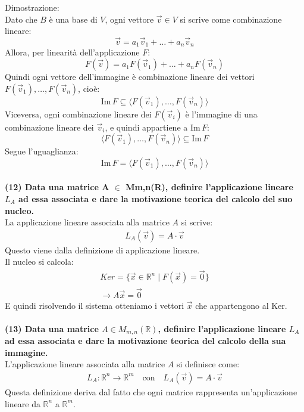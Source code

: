 \documentclass[10pt]{extarticle}
\begin{document}
Dimostrazione: \\
Dato che $B$ è una base di $V$, ogni vettore $\vec{v} \in V$ si scrive come combinazione lineare:
\[
\vec{v} = a_1 \vec{v}_1 + \dots + a_n \vec{v}_n
\]
Allora, per linearità dell'applicazione $F$:
\[
F(\vec{v}) = a_1 F(\vec{v}_1) + \dots + a_n F(\vec{v}_n)
\]
Quindi ogni vettore dell'immagine è combinazione lineare dei vettori $F(\vec{v}_1), \dots, F(\vec{v}_n)$, cioè:
\[
\text{Im}\, F \subseteq \langle F(\vec{v}_1), \dots, F(\vec{v}_n) \rangle
\]
Viceversa, ogni combinazione lineare dei $F(\vec{v}_i)$ è l'immagine di una combinazione lineare dei $\vec{v}_i$, e quindi appartiene a $\text{Im}\, F$:
\[
\langle F(\vec{v}_1), \dots, F(\vec{v}_n) \rangle \subseteq \text{Im}\, F
\]
Segue l'uguaglianza:
\[
\text{Im}\, F = \langle F(\vec{v}_1), \dots, F(\vec{v}_n) \rangle
\]
\vspace{1em}\\
\textbf{(12) Data una matrice A $\in$ Mm,n(R), definire l’applicazione lineare $L_A$ ad essa associata e dare la motivazione teorica del calcolo del suo nucleo.}\\
La applicazione lineare associata alla matrice $A$ si scrive:
\begin{align*}
    L_A(\vec{v})=A\cdot\vec{v}
\end{align*}
Questo viene dalla definizione di applicazione lineare. \\
Il nucleo si calcola:
\begin{align*}
    Ker=\{\vec{x} \in \mathbb{R}^n \mid F(\vec{x})=\vec{0}\} \\
    \to A\vec{x}=\vec{0}
\end{align*}
E quindi risolvendo il sistema otteniamo i vettori $\vec{x}$ che appartengono al Ker. \\
\vspace{1em} \\
\textbf{(13) Data una matrice $A \in M_{m,n}(\mathbb{R})$, definire l’applicazione lineare $L_A$ ad essa associata e dare la motivazione teorica del calcolo della sua immagine.} \\

L'applicazione lineare associata alla matrice $A$ si definisce come:
\begin{align*}
    L_A : \mathbb{R}^n \to \mathbb{R}^m \quad \text{con} \quad L_A(\vec{v}) = A\cdot\vec{v}
\end{align*}
Questa definizione deriva dal fatto che ogni matrice rappresenta un'applicazione lineare da $\mathbb{R}^n$ a $\mathbb{R}^m$.
\end{document}
